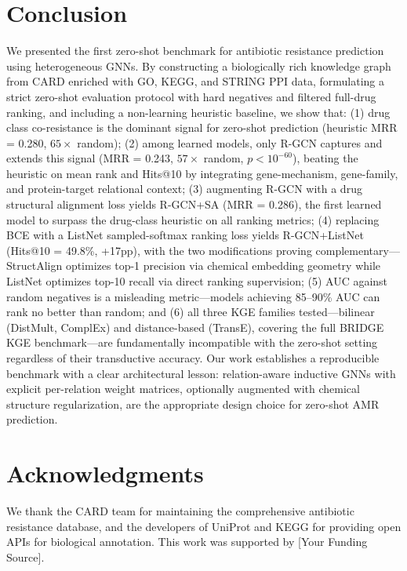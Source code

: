 \documentclass[conference]{IEEEtran}
\begin{document}
\section{Conclusion}

We presented the first zero-shot benchmark for antibiotic resistance prediction using heterogeneous GNNs. By constructing a biologically rich knowledge graph from CARD enriched with GO, KEGG, and STRING PPI data, formulating a strict zero-shot evaluation protocol with hard negatives and filtered full-drug ranking, and including a non-learning heuristic baseline, we show that: (1) drug class co-resistance is the dominant signal for zero-shot prediction (heuristic MRR = 0.280, $65\times$ random); (2) among learned models, only R-GCN captures and extends this signal (MRR = 0.243, $57\times$ random, $p < 10^{-60}$), beating the heuristic on mean rank and Hits@10 by integrating gene-mechanism, gene-family, and protein-target relational context; (3) augmenting R-GCN with a drug structural alignment loss yields R-GCN+SA (MRR = 0.286), the first learned model to surpass the drug-class heuristic on all ranking metrics; (4) replacing BCE with a ListNet sampled-softmax ranking loss yields R-GCN+ListNet (Hits@10 = 49.8\%, +17pp), with the two modifications proving complementary---StructAlign optimizes top-1 precision via chemical embedding geometry while ListNet optimizes top-10 recall via direct ranking supervision; (5) AUC against random negatives is a misleading metric---models achieving 85--90\% AUC can rank no better than random; and (6) all three KGE families tested---bilinear (DistMult, ComplEx) and distance-based (TransE), covering the full BRIDGE \cite{bessadok2026bridge} KGE benchmark---are fundamentally incompatible with the zero-shot setting regardless of their transductive accuracy. Our work establishes a reproducible benchmark with a clear architectural lesson: relation-aware inductive GNNs with explicit per-relation weight matrices, optionally augmented with chemical structure regularization, are the appropriate design choice for zero-shot AMR prediction.

\section*{Acknowledgments}

We thank the CARD team for maintaining the comprehensive antibiotic resistance database, and the developers of UniProt and KEGG for providing open APIs for biological annotation. This work was supported by [Your Funding Source].
\end{document}

